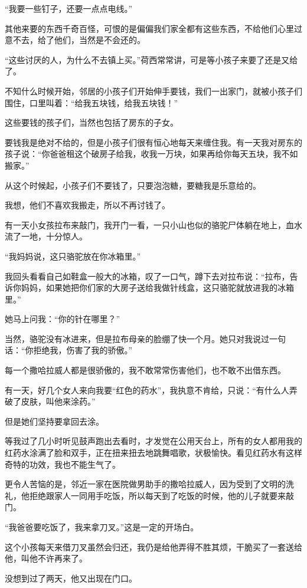 \par “我要一些钉子，还要一点点电线。”
\par 其他来要的东西千奇百怪，可恨的是偏偏我们家全都有这些东西，不给他们心里过意不去，给了他们，当然是不会还的。
\par “这些讨厌的人，为什么不去镇上买。”荷西常常讲，可是等小孩子来要了还是又给了。
\par 不知什么时候开始，邻居的小孩子们开始伸手要钱，我们一出家门，就被小孩子们围住，口里叫着：“给我五块钱，给我五块钱！”
\par 这些要钱的孩子们，当然也包括了房东的子女。
\par 要钱我是绝对不给的，但是小孩子们很有恒心地每天来缠住我。有一天我对房东的孩子说：“你爸爸租这个破房子给我，收我一万块，如果再给你每天五块，我不如搬家。”
\par 从这个时候起，小孩子们不要钱了，只要泡泡糖，要糖我是乐意给的。
\par 我想，他们不喜欢我搬走，所以不再讨钱了。
\par 有一天小女孩拉布来敲门，我开门一看，一只小山也似的骆驼尸体躺在地上，血水流了一地，十分惊人。
\par “我妈妈说，这只骆驼放在你冰箱里。”
\par 我回头看看自己如鞋盒一般大的冰箱，叹了一口气，蹲下去对拉布说：“拉布，告诉你妈妈，如果她把你们家的大房子送给我做针线盒，这只骆驼就放进我的冰箱里。”
\par 她马上问我：“你的针在哪里？”
\par 当然，骆驼没有冰进来，但是拉布母亲的脸绷了快一个月。她只对我说过一句话：“你拒绝我，伤害了我的骄傲。”
\par 每一个撒哈拉威人都是很骄傲的，我不敢常常伤害他们，也不敢不出借东西。
\par 有一天，好几个女人来向我要“红色的药水”，我执意不肯给，只说：“有什么人弄破了皮肤，叫他来涂药。”
\par 但是她们坚持要拿回去涂。
\par 等我过了几小时听见鼓声跑出去看时，才发觉在公用天台上，所有的女人都用我的红药水涂满了脸和双手，正在扭来扭去地跳舞唱歌，状极愉快。看见红药水有这样奇特的功效，我也不能生气了。
\par 更令人苦恼的是，邻近一家在医院做男助手的撒哈拉威人，因为受到了文明的洗礼，他拒绝跟家人一同用手吃饭，所以每天到了吃饭的时候，他的儿子就要来敲门。
\par “我爸爸要吃饭了，我来拿刀叉。”这是一定的开场白。
\par 这个小孩每天来借刀叉虽然会归还，我仍是给他弄得不胜其烦，干脆买了一套送给他，叫他不许再来了。
\par 没想到过了两天，他又出现在门口。
